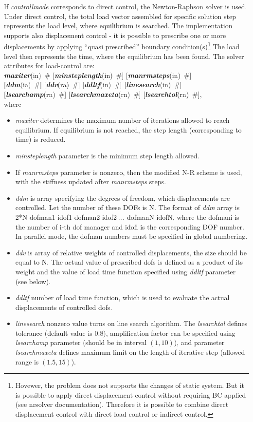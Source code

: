 \documentclass[draft]{article}
\newcommand{\param}[1]{{\em #1}}
\newcommand{\keywordnotype}[1]{\mbox{{\it{\bf{#1}}}}}
\newcommand{\keyword}[2]{\mbox{{\keywordnotype{#1}\tiny (#2)}}}
\newcommand{\field}[2]{\mbox{\keyword{#1}{#2}~\#}}
\newcommand{\optField}[2]{\mbox{[\field{#1}{#2}]}}
\newcommand{\Pmode}[1]{{\sffamily #1}}
\begin{document}
If \param{controllmode} corresponds to direct control, the
Newton-Raphson solver is used. Under direct control, the total load
vector assembled for specific solution step represents the load level,
where equilibrium is searched. The implementation supports also
displacement control -  it is possible to prescribe one or more
displacements by applying ``quasi prescribed'' boundary
condition(s)\footnote{Hovewer, the problem does not supports the
changes of static system. But it is possible to apply direct
displacement control without requiring BC applied (see nrsolver
documentation). Therefore it is possible to combine
direct displacement control with direct load control or indirect
control.} 
The load level then represents the
time, where the equilibrium has been found. The solver attributes for
load-control are:\\ \field{maxiter}{in} \optField{minsteplength}{in}
\optField{manrmsteps}{in}\\ \optField{ddm}{ia} \optField{ddv}{ra}
\optField{ddltf}{in} \optField{linesearch}{in}\\
\optField{lsearchamp}{rn} \optField{lsearchmaxeta}{rn} \optField{lsearchtol}{rn},\\ where 
\begin{itemize}
\item \param{maxiter} determines the maximum
number of iterations allowed to reach equilibrium. If equilibrium is
not reached, the step length (corresponding to time) is reduced.
\item \param{minsteplength} parameter is the minimum step length
allowed. 
\item If \param{manrmsteps} parameter is nonzero, then the modified
N-R scheme is used, with the stiffness updated after
\param{manrmsteps} steps.
\item \param{ddm} is array specifying the degrees of freedom, 
which displacements are controlled. 
Let the number of these DOFs is N.
The format of \param{ddm} array is 2*N dofman1 idof1
dofman2 idof2 ... dofmanN idofN, where the dofmani is the number of i-th dof manager  and idofi is the
corresponding DOF number. \Pmode{In parallel mode, the dofman numbers
  must be specified in global numbering.}
\item \param{ddv} is array of relative weights of controlled
displacements, the size should be equal to N. The actual value of 
prescribed dofs is defined as a product of its weight and the value of
load time function specified using \param{ddltf} parameter (see
below).
\item \param{ddltf} number of load time function, which is used to
evaluate the actual displacements of controlled dofs.
\item \param {linesearch} nonzero value turns on line search
  algorithm. The \param{lsearchtol} defines tolerance (default value
  is 0.8), amplification
  factor can be specified using \param{lsearchamp} parameter (should
  be in interval $(1,10)$), and parameter \param{lsearchmaxeta}
  defines maximum limit on the length of iterative step (allowed range
  is $(1.5,15)$).
\end{itemize}
\end{document}
